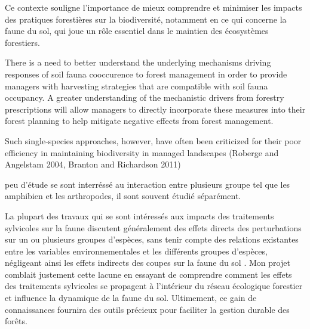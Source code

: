 Ce contexte souligne l'importance de mieux comprendre et minimiser les impacts des pratiques forestières sur la biodiversité, notamment en ce qui concerne la faune du sol, qui joue un rôle essentiel dans le maintien des écosystèmes forestiers.


There is a need to better understand the underlying mechanisms driving responses of soil fauna cooccurence to forest management in order to provide managers with harvesting strategies that are compatible with soil fauna occupancy.
A greater understanding of the mechanistic drivers from forestry prescriptions will allow managers to directly incorporate these measures into their forest planning to help mitigate negative effects from forest management.

Such single-species approaches, however, have often been criticized for their poor efficiency in maintaining biodiversity in managed landscapes (Roberge and Angelstam 2004, Branton and Richardson 2011)

peu d'étude se sont interréssé au interaction entre plusieurs groupe tel que les amphibien et les arthropodes, il sont souvent étudié séparément.

La plupart des travaux qui se sont intéressés aux impacts des traitements sylvicoles sur la faune discutent généralement des effets directs des perturbations sur un ou plusieurs groupes d'espèces, 
sans tenir compte des relations existantes entre les variables environnementales et les différents groupes d'espèces, 
négligeant ainsi les effets indirects des coupes sur la faune du sol \citep{josephIntegratingOccupancyModels2016,Pollierer2021Diversityfunctional,Kudrin2023metaanalysiseffects}. 
Mon projet comblait justement cette lacune en essayant de comprendre comment les effets des traitements sylvicoles se propagent à l’intérieur du réseau écologique forestier et influence la dynamique de la faune du sol.  
Ultimement, ce gain de connaissances fournira des outils précieux pour faciliter la gestion durable des forêts.



